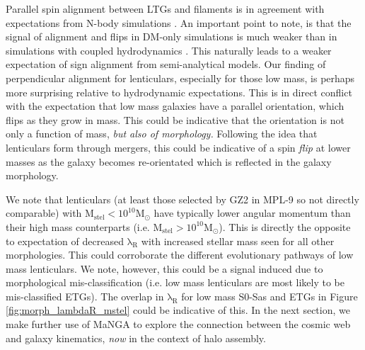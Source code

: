 Parallel spin alignment between LTGs and filaments is in agreement with expectations from N-body simulations \citep[e.g.][]{laigle2015}. An important point to note, is that the signal of alignment and flips in DM-only simulations is much weaker than in simulations with coupled hydrodynamics \citep[see discussion in][]{welker2020}. This naturally leads to a weaker expectation of sign alignment from semi-analytical models. Our finding of perpendicular alignment for lenticulars, especially for those low mass, is perhaps more surprising relative to hydrodynamic expectations. This is in direct conflict with the expectation that low mass galaxies have a parallel orientation, which flips as they grow in mass. This could be indicative that the orientation is not only a function of mass, \textit{but also of morphology.} Following the idea that lenticulars form through mergers, this could be indicative of a spin \textit{flip} at lower masses as the galaxy becomes re-orientated which is reflected in the galaxy morphology. 

We note that lenticulars (at least those selected by GZ2 in MPL-9 so not directly comparable) with $\mathrm{M_{stel} < 10^{10}M_{\odot}}$ have typically lower angular momentum than their high mass counterparts (i.e. $\mathrm{M_{stel} > 10^{10}M_{\odot}}$). This is directly the opposite to expectation of decreased $\mathrm{\lambda_R}$ with increased stellar mass seen for all other morphologies. This could corroborate the different evolutionary pathways of low mass lenticulars. We note, however, this could be a signal induced due to morphological mis-classification (i.e. low mass lenticulars are most likely to be mis-classified ETGs). The overlap in $\mathrm{\lambda_R}$ for low mass S0-Sas and ETGs in Figure \ref{fig:morph_lambdaR_mstel} could be indicative of this. In the next section, we make further use of MaNGA to explore the connection between the cosmic web and galaxy kinematics, \textit{now} in the context of halo assembly.